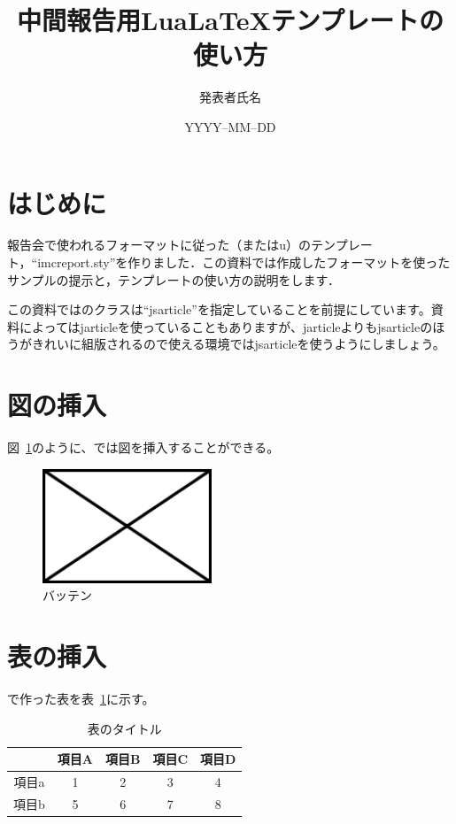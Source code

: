 \documentclass[10pt,a4j,twocolumn]{ltjsarticle}
\title{中間報告用Lua\LaTeX テンプレートの使い方} %
\author{発表者氏名}                              %
\date{YYYY--MM--DD}                              %
\begin{document}
\maketitle

\section{はじめに}

報告会で使われるフォーマットに従った\pLaTeX（またはu\pLaTeX）のテンプレート，``imcreport.sty''を作りました．この資料では作成したフォーマットを使ったサンプルの提示と，テンプレートの使い方の説明をします．

この資料では\pLaTeX のクラスは``jsarticle''を指定していることを前提にしています。資料によってはjarticleを使っていることもありますが、jarticleよりもjsarticleのほうがきれいに組版されるので使える環境ではjsarticleを使うようにしましょう。

\section{図の挿入}

図~\ref{バッテンのラベル}のように、\pLaTeX では図を挿入することができる。
\begin{figure}[bp]
  \centering
  \includegraphics[width=0.45\textwidth]{./sample_figure.pdf}
  \caption{バッテン}
  \label{バッテンのラベル}
\end{figure}

\section{表の挿入}

\pLaTeX で作った表を表~\ref{表のラベル}に示す。
\begin{table}[bp]
  \centering
  \caption{表のタイトル}
  \label{表のラベル}
  \begin{tabular}{c|cccc}
    \hline
          & 項目A & 項目B & 項目C & 項目D \\
    \hline \hline
    項目a & 1     & 2     & 3     & 4 \\
    項目b & 5     & 6     & 7     & 8 \\
    \hline
  \end{tabular}
\end{table}
\end{document}
